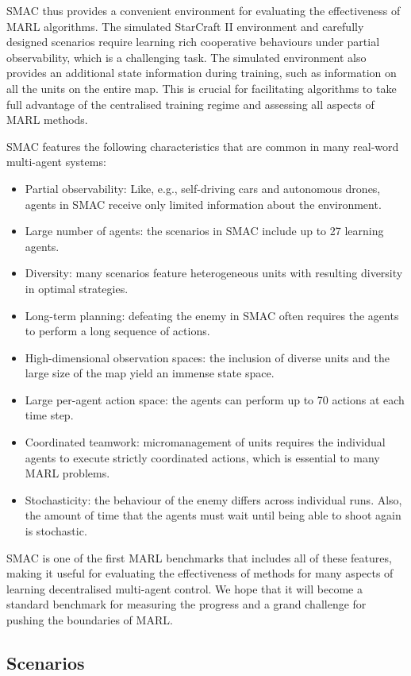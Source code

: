 \documentclass[twoside,11pt]{article}
\begin{document}
SMAC thus provides a convenient environment for evaluating the effectiveness of MARL algorithms. The simulated StarCraft II environment and carefully designed scenarios require learning rich cooperative behaviours under partial observability, which is a challenging task. The simulated environment also provides an additional state information during training, such as information on all the units on the entire map. This is crucial for facilitating algorithms to take full advantage of the centralised training regime and assessing all aspects of MARL methods.

SMAC features the following characteristics that are common in many real-word multi-agent systems:
\begin{itemize}
	\setlength{\itemsep}{0pt}
	\setlength{\parskip}{2pt}
	\item Partial observability: Like, e.g., 
	self-driving cars and autonomous drones, agents in SMAC receive only 
	limited information about the environment.
	\item Large number of agents: the scenarios in SMAC include up to 27 learning agents.
	\item Diversity: many scenarios feature heterogeneous units with resulting 
	diversity in optimal strategies.
	\item Long-term planning: defeating the enemy in SMAC often requires the agents to perform a long sequence of actions.
	\item High-dimensional observation spaces: the inclusion of diverse units and the large size of the map yield an immense state space.
	\item Large per-agent action space: the agents can perform up to 70 actions 
	at each time step.
	\item Coordinated teamwork: micromanagement of units requires the individual agents to execute strictly coordinated actions, which is essential to many MARL problems.
	\item Stochasticity: the behaviour of the enemy differs across individual runs. Also, the amount of time that the agents must wait until being able to shoot again is stochastic.
\end{itemize}
SMAC is one of the first MARL benchmarks that includes all of these features, 
making it useful for evaluating the effectiveness of methods for many aspects 
of learning decentralised multi-agent control.
We hope that it will become a standard benchmark for measuring the progress and a grand challenge for pushing the boundaries of MARL.
\subsection{Scenarios}
\end{document}
